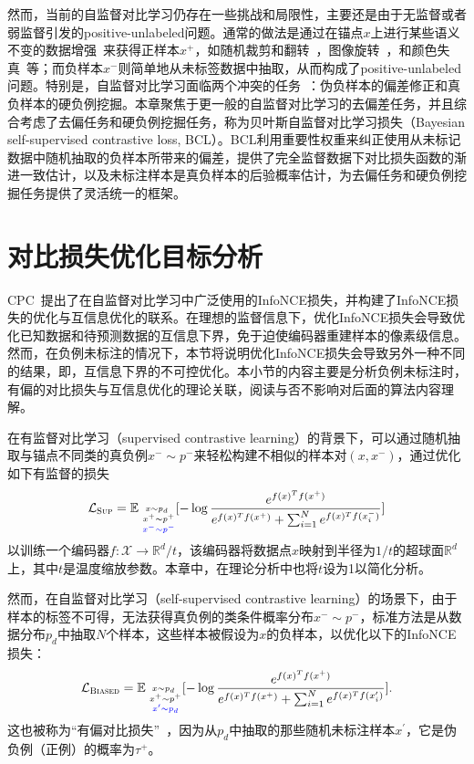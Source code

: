 然而，当前的自监督对比学习仍存在一些挑战和局限性，主要还是由于无监督或者弱监督引发的positive-unlabeled问题。通常的做法是通过在锚点$x$上进行某些语义不变的数据增强~\cite{Chen:2020:ICML}来获得正样本$x^+$，如随机裁剪和翻转~\cite{Oord:2018:arxiv}，图像旋转~\cite{Komodakis:2018:ICLR}，和颜色失真~\cite{Szegedy:2015:CVPR}等；而负样本$x^-$则简单地从未标签数据中抽取，从而构成了positive-unlabeled问题。特别是，自监督对比学习面临两个冲突的任务~\cite{Liu:2021:TKDE,Robinson:2021:ICLR}：伪负样本的偏差修正和真负样本的硬负例挖掘。本章聚焦于更一般的自监督对比学习的去偏差任务，并且综合考虑了去偏任务和硬负例挖掘任务，称为贝叶斯自监督对比学习损失（Bayesian self-supervised contrastive loss, BCL）。BCL利用重要性权重来纠正使用从未标记数据中随机抽取的负样本所带来的偏差，提供了完全监督数据下对比损失函数的渐进一致估计，以及未标注样本是真负样本的后验概率估计，为去偏任务和硬负例挖掘任务提供了灵活统一的框架。

\section{对比损失优化目标分析}
CPC~\cite{Oord:2018:arxiv}提出了在自监督对比学习中广泛使用的InfoNCE损失，并构建了InfoNCE损失的优化与互信息优化的联系。在理想的监督信息下，优化InfoNCE损失会导致优化已知数据和待预测数据的互信息下界，免于迫使编码器重建样本的像素级信息。然而，在负例未标注的情况下，本节将说明优化InfoNCE损失会导致另外一种不同的结果，即，互信息下界的不可控优化。本小节的内容主要是分析负例未标注时，有偏的对比损失与互信息优化的理论关联，阅读与否不影响对后面的算法内容理解。

在有监督对比学习（supervised contrastive learning）的背景下，可以通过随机抽取与锚点不同类的真负例$x^-\sim p^-$来轻松构建不相似的样本对$(x,x^-)$，通过优化如下有监督的损失
\begin{equation}\label{Eq:SupLoss}
	\small
	\mathcal{L}_\textsc{Sup} = \mathbb E_{\substack{x \sim p_d\\~x^+ \sim p^+\\\color{blue}{~x^- \sim p^-}} }
	[-\log \frac{e^{f(x)^Tf(x^+)}}{e^{f(x)^Tf(x^+)} + \sum_{i=1}^Ne^{f(x)^Tf(x_i^-)}}]
\end{equation}
以训练一个编码器$f: \mathcal{X} \rightarrow \mathbb{R}^d/t$，该编码器将数据点$x$映射到半径为$1/t$的超球面$\mathbb{R}^d$上，其中$t$是温度缩放参数。本章中，在理论分析中也将$t$设为1以简化分析。

然而，在自监督对比学习（self-supervised contrastive learning）的场景下，由于样本的标签不可得，无法获得真负例的类条件概率分布$x^- \sim p^-$，标准方法是从数据分布$p_d$中抽取$N$个样本，这些样本被假设为$x$的负样本，以优化以下的InfoNCE损失：
\begin{equation}\label{Eq:BiasLoss}
	\small
	\mathcal{L}_\textsc{Biased}= \mathbb E_{ \substack{x \sim p_d\\~x^+ \sim p^+\\\color{blue}{~x^\prime \sim p_d}}}
	[-\log \frac{e^{f(x)^Tf(x^+)}}{e^{f(x)^Tf(x^+)} + \sum_{i=1}^{N}e^{f(x)^Tf(x_i^\prime)}}].
\end{equation}
这也被称为“有偏对比损失”~\cite{Chuang:2020:NIPS}，因为从$p_d$中抽取的那些随机未标注样本$x^\prime$，它是伪负例（正例）的概率为$\tau^+$。

